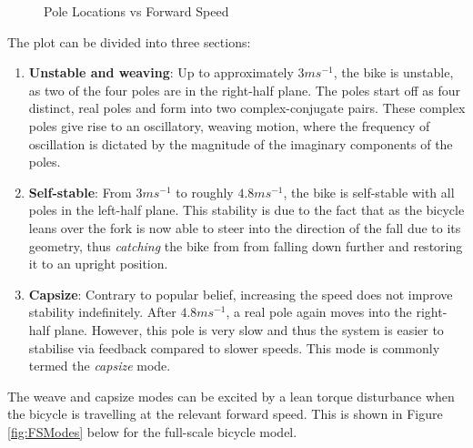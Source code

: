 \begin{figure}[H]
	\centering
	\caption{Pole Locations vs Forward Speed}
	\label{fig:PoleVsSpeed}
\end{figure}

The plot can be divided into three sections:

\begin{enumerate}
\item{\textbf{Unstable and weaving}: Up to approximately $3ms^{-1}$, the bike is unstable, as two of the four poles are in the right-half plane. The poles start off as four distinct, real poles and form into two complex-conjugate pairs. These complex poles give rise to an oscillatory, weaving motion, where the frequency of oscillation is dictated by the magnitude of the imaginary components of the poles.}
\item{\textbf{Self-stable}: From $3ms^{-1}$ to roughly $4.8ms^{-1}$, the bike is self-stable with all poles in the left-half plane. This stability is due to the fact that as the bicycle leans over the fork is now able to steer into the direction of the fall due to its geometry, thus \textit{catching} the bike from from falling down further and restoring it to an upright position.}
\item{\textbf{Capsize}: Contrary to popular belief, increasing the speed does not improve stability indefinitely. After $4.8ms^{-1}$, a real pole again moves into the right-half plane. However, this pole is very slow and thus the system is easier to stabilise via feedback compared to slower speeds. This mode is commonly termed the \textit{capsize} mode.}
\end{enumerate}

The weave and capsize modes can be excited by a lean torque disturbance when the bicycle is travelling at the relevant forward speed. This is shown in Figure \ref{fig:FSModes} below for the full-scale bicycle model.

